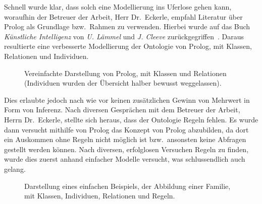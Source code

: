 Schnell wurde klar, dass solch eine Modellierung ins Uferlose gehen kann, woraufhin der Betreuer der Arbeit, Herr Dr.\ Eckerle, empfahl Literatur über Prolog als Grundlage bzw.\ Rahmen zu verwenden. Hierbei wurde auf das Buch \textit{Künstliche Intelligenz} von \textit{U. Lämmel} und \textit{J. Cleeve} zurückgegriffen~\cite{laemmel}. Daraus resultierte eine verbesserte Modellierung der Ontologie von Prolog, mit Klassen, Relationen und Individuen.

\begin{figure}[H]
\centering {}
\caption{Vereinfachte Darstellung von Prolog, mit Klassen und Relationen (Individuen wurden der Übersicht halber bewusst weggelassen).\label{fig:prolog_baum}\protect\footnotemark}
\end{figure}

Dies erlaubte jedoch nach wie vor keinen zusätzlichen Gewinn von Mehrwert in Form von Inferenz. Nach diversen Gesprächen mit dem Betreuer der Arbeit, Herrn Dr.\ Eckerle, stellte sich heraus, dass der Ontologie Regeln fehlen. Es wurde dann versucht mithilfe von Prolog das Konzept von Prolog abzubilden, da dort ein Auskommen ohne Regeln nicht möglich ist bzw.\ ansonsten keine Abfragen gestellt werden können. Nach diversen, erfolglosen Versuchen Regeln zu finden, wurde dies zuerst anhand einfacher Modelle versucht, was schlussendlich auch gelang.

\begin{figure}[H]
\centering {}
\caption{Darstellung eines einfachen Beispiels, der Abbildung einer Familie, mit Klassen, Individuen, Relationen und Regeln.\label{fig:familien_netz}\protect\footnotemark}
\end{figure}


